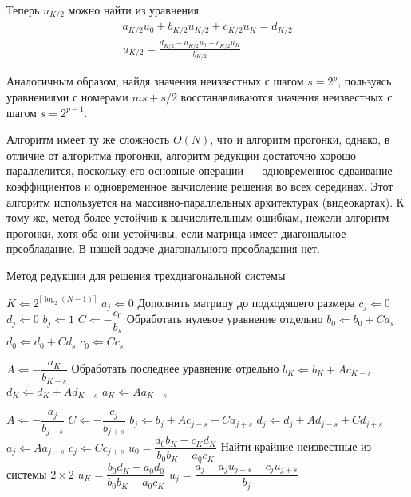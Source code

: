 \documentclass[12pt]{article}
\begin{document}
Теперь $u_{K/2}$ можно найти из уравнения
\begin{gather*}
a_{K/2} u_0 + b_{K/2} u_{K/2} + c_{K/2} u_K = d_{K/2}\\
u_{K/2} = \frac{d_{K/2} - a_{K/2}u_0 - c_{K/2} u_K}{b_{K/2}}
\end{gather*}

Аналогичным образом, найдя значения неизвестных с шагом $s = 2^p$, пользуясь
уравнениями с номерами $ms + s/2$ восстанавливаются значения неизвестных с шагом
$s = 2^{p-1}$.

Алгоритм имеет ту же сложность $O(N)$, что и алгоритм прогонки, однако, в отличие
от алгоритма прогонки, алгоритм редукции достаточно хорошо параллелится,
поскольку его основные операции --- одновременное сдваивание коэффициентов и
одновременное вычисление решения во всех серединах. Этот алгоритм используется
на массивно-параллельных архитектурах (видеокартах). К тому же, метод более
устойчив к вычислительным ошибкам, нежели алгоритм прогонки, хотя оба они
устойчивы, если матрица имеет диагональное преобладание. В нашей задаче
диагонального преобладания нет.

\begin{algorithm}
\caption{Метод редукции для решения трехдиагональной системы}
\label{alg:reduct}
\begin{algorithmic}[1]
\State $K \Leftarrow 2^{\lceil \log_2 (N-1) \rceil}$
	\State $a_j \Leftarrow 0$ \Comment Дополнить матрицу до подходящего размера
	\State $c_j \Leftarrow 0$
	\State $d_j \Leftarrow 0$
	\State $b_j \Leftarrow 1$
\EndFor
{}
	\State $C \Leftarrow -\dfrac{c_0}{b_s}$
	\Comment Обработать нулевое уравнение отдельно
	\State $b_0 \Leftarrow b_0 + C a_s$
	\State $d_0 \Leftarrow d_0 + C d_s$
	\State $c_0 \Leftarrow C c_s$

	\State $A \Leftarrow -\dfrac{a_K}{b_{K-s}}$
	\Comment Обработать последнее уравнение отдельно
	\State $b_K \Leftarrow b_K + A c_{K-s}$
	\State $d_K \Leftarrow d_K + A d_{K-s}$
	\State $a_K \Leftarrow A a_{K-s}$

		\State $A \Leftarrow -\dfrac{a_j}{b_{j-s}}$
		\State $C \Leftarrow -\dfrac{c_j}{b_{j+s}}$
		\State $b_j \Leftarrow b_j + A c_{j - s} + C a_{j + s}$ 
		\State $d_j \Leftarrow d_j + A d_{j - s} + C d_{j + s}$
		\State $a_j \Leftarrow A a_{j-s}$
		\State $c_j \Leftarrow C c_{j+s}$
	\EndFor
\EndFor
\State $u_0 = \dfrac{d_0 b_K - c_K d_K}{b_0 b_K - a_0 c_K}$
\Comment Найти крайние неизвестные из системы $2 \times 2$
\State $u_K = \dfrac{b_0 d_K - a_0 d_0}{b_0 b_K - a_0 c_K}$
		\State $u_j = \dfrac{d_j - a_j u_{j-s} - c_j u_{j+s}}{b_j}$
	\EndFor
\EndFor
\end{algorithmic}
\end{algorithm}
\end{document}
